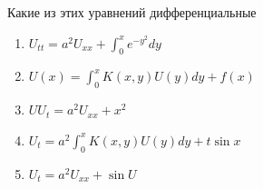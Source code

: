 Какие из этих уравнений дифференциальные

\begin{enumerate}[label=\arabic*)]
    \item \(U_{tt}=a^2U_{xx}+\int_{0}^{x} e^{-y^2}dy\)
    \item \(U\left(x\right)=\int_{0}^{x} K\left(x,y\right)U\left(y\right)dy+f(x)\)
    \item \(UU_t=a^2U_{xx}+x^2\)
    \item \(U_t=a^2\int_{0}^{x} K\left(x,y\right)U\left(y\right)dy+t \sin x\)
    \item \(U_t=a^2U_{xx}+\sin U\)
\end{enumerate}

